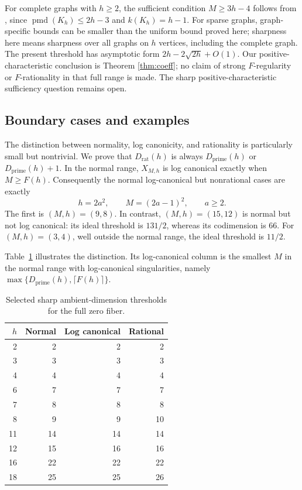 \documentclass[11pt]{article}
\numberwithin{equation}{section}
\theoremstyle{remark}
\newcommand{\Dprime}{D_{\mathrm{prime}}}
\newcommand{\Drat}{D_{\mathrm{rat}}}
\begin{document}
For complete graphs with $h\ge2$, the sufficient condition $M\ge3h-4$
follows from \cite[arXiv version, Lemma 2.5 and Theorem 3.2]{TV}, since
$\operatorname{pmd}(K_h)\le2h-3$ and $k(K_h)=h-1$.
For sparse graphs, graph-specific bounds can be smaller than the
uniform bound proved here; sharpness here means sharpness over all
graphs on $h$ vertices, including the complete graph. The present
threshold has asymptotic form $2h-2\sqrt{2h}+O(1)$.
Our positive-characteristic conclusion is Theorem \ref{thm:coeff};
no claim of strong $F$-regularity or $F$-rationality in that full range is
made. The sharp positive-characteristic sufficiency question remains open.

\subsection{Boundary cases and examples}
The distinction between normality, log canonicity, and rationality is
particularly small but nontrivial. We prove that $\Drat(h)$ is always
$\Dprime(h)$ or $\Dprime(h)+1$. In the normal range,
$X_{M,h}$ is log canonical exactly when $M\ge F(h)$.
Consequently the normal log-canonical but nonrational cases are exactly
\[
 h=2a^2,\qquad M=(2a-1)^2,\qquad a\ge2.
\]
The first is $(M,h)=(9,8)$. In contrast, $(M,h)=(15,12)$ is normal
but not log canonical: its ideal threshold is $131/2$, whereas its
codimension is $66$. For $(M,h)=(3,4)$, well outside the normal range,
the ideal threshold is $11/2$.

Table~\ref{tab:thresholds} illustrates the distinction. Its log-canonical
column is the smallest $M$ in the normal range with log-canonical
singularities, namely $\max\{\Dprime(h),\lceil F(h)\rceil\}$.

\begin{table}[htbp]
\centering
\begin{tabular}{rrrr}
\toprule
$h$ & Normal & Log canonical & Rational \\
\midrule
2 & 2 & 2 & 2 \\
3 & 3 & 3 & 3 \\
4 & 4 & 4 & 4 \\
6 & 7 & 7 & 7 \\
7 & 8 & 8 & 8 \\
8 & 9 & 9 & 10 \\
11 & 14 & 14 & 14 \\
12 & 15 & 16 & 16 \\
16 & 22 & 22 & 22 \\
18 & 25 & 25 & 26 \\
\bottomrule
\end{tabular}
\caption{Selected sharp ambient-dimension thresholds for the full zero fiber.}
\label{tab:thresholds}
\end{table}
\end{document}
